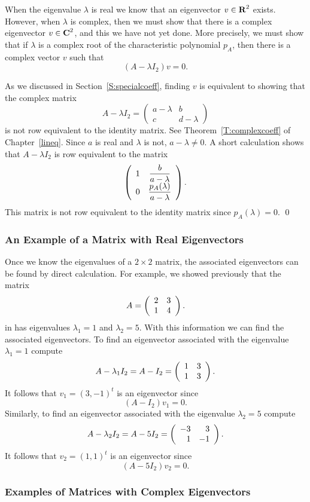 \proof  When the eigenvalue $\lambda$ is real we know that an
eigenvector $v\in\mbox{$\bf{R}$}^2$ exists.  However, when $\lambda$ is complex,
then we must show that there is a complex eigenvector $v\in\mbox{$\bf{C}$}^2$,
and this we have not yet done.  More precisely, we must show that
if $\lambda$ is a complex root of the characteristic polynomial
$p_A$, then there is a complex vector $v$ such that
\[
(A-\lambda I_2)v = 0.
\]

As we discussed in Section~\ref{S:specialcoeff}, finding $v$ is
equivalent to showing that the complex matrix
\[
A-\lambda I_2 = \left(\begin{array}{cc} a-\lambda & b \\
c & d-\lambda \end{array} \right)
\]
is not row equivalent to the identity matrix.  See
Theorem~\ref{T:complexcoeff} of Chapter~\ref{lineq}.  Since
$a$ is real and $\lambda$ is not, $a-\lambda\neq 0$. A
short calculation shows that $A-\lambda I_2$ is row equivalent to
the matrix
\arraystart
\[
\left(\begin{array}{cc} 1 & \displaystyle\frac{b}{a-\lambda} \\
0 & \displaystyle\frac{p_A(\lambda)}{a-\lambda} \end{array} \right).
\]
\arrayfinish
This matrix is not row equivalent to the identity matrix since
$p_A(\lambda)=0$.  \qed

\subsubsection*{An Example of a Matrix with Real Eigenvectors}

Once we know the eigenvalues of a $2\times 2$ matrix, the associated eigenvectors can be found by direct calculation.  For example, we 
showed previously that the matrix
\[
A=\left(\begin{array}{rr} 2 & 3\\ 1 &4\end{array}\right).
\]
in  has eigenvalues $\lambda_1=1$ and $\lambda_2=5$.  
With this information we can find the associated eigenvectors.  To find 
an eigenvector associated with the eigenvalue $\lambda_1=1$ compute
\[
A-\lambda_1 I_2 = A-I_2 = \left(\begin{array}{rr} 1 & 3\\ 1 &3\end{array}\right).
\]
It follows that $v_1=(3,-1)^t$ is an eigenvector since 
\[
(A-I_2)v_1 = 0.
\]
Similarly, to find an eigenvector associated with the eigenvalue 
$\lambda_2=5$ compute
\[
A - \lambda_2 I_2 = A-5I_2 = \left(\begin{array}{rr} -3 & 3\\ 1 &-1\end{array}\right).
\]
It follows that $v_2=(1,1)^t$ is an eigenvector since 
\[
(A-5I_2)v_2 = 0.
\]


\subsubsection*{Examples of Matrices with Complex Eigenvectors}

